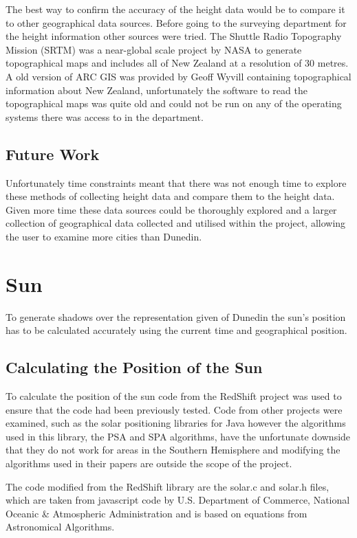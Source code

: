 \documentclass[12pt]{report}
\begin{document}
The best way to confirm the accuracy of the height data would be to compare it to other geographical data sources. Before going to the surveying department for the height information other sources were tried. The Shuttle Radio Topography Mission (SRTM)\cite{srtm} was a near-global scale project by NASA to generate topographical maps and includes all of New Zealand at a resolution of 30 metres. A old version of ARC GIS was provided by Geoff Wyvill containing topographical information about New Zealand, unfortunately the software to read the topographical maps was quite old and could not be run on any of the operating systems there was access to in the department.

\subsection{Future Work}
Unfortunately time constraints meant that there was not enough time to explore these methods of collecting height data and compare them to the height data.
 Given more time these data sources could be thoroughly explored and a larger collection of geographical data collected and utilised within the project, allowing the user to examine more cities than Dunedin.

\section{Sun}
To generate shadows over the representation given of Dunedin the sun's position has to be calculated accurately using the current time and geographical position.


\subsection{Calculating the Position of the Sun}
To calculate the position of the sun code from the RedShift project\cite{redshift} was used to ensure that the code had been previously tested. Code from other projects were examined, such as the solar positioning libraries for Java\cite{javasunlib} however the algorithms used in this library, the PSA\cite{psa} and SPA\cite{spa} algorithms, have the unfortunate downside that they do not work for areas in the Southern Hemisphere and modifying the algorithms used in their papers are outside the scope of the project.

The code modified from the RedShift library are the solar.c and solar.h files, which are taken from javascript code by U.S. Department of Commerce, National Oceanic & Atmospheric Administration\cite{usnoaa} and is based on equations from Astronomical Algorithms\cite{astronomicalalgorithms}.
\end{document}
